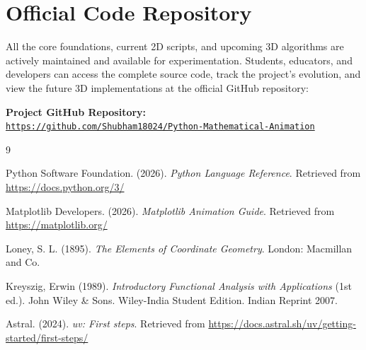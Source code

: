 \documentclass[12pt, a4paper]{report}
\begin{document}
\section{Official Code Repository}
All the core foundations, current 2D scripts, and upcoming 3D algorithms are actively maintained and available for experimentation. Students, educators, and developers can access the complete source code, track the project's evolution, and view the future 3D implementations at the official GitHub repository:

\vspace{0.4cm}
\begin{mdframed}[backgroundcolor=gray!10, linecolor=black, linewidth=1pt, roundcorner=5pt]
    \centering
    \textbf{Project GitHub Repository:} \\
    \vspace{0.2cm}
    \href{https://github.com/Shubham18024/Python-Mathematical-Animation}{\texttt{https://github.com/Shubham18024/Python-Mathematical-Animation}}
\end{mdframed}
\vspace{0.5cm}

\begin{thebibliography}{9}

Python Software Foundation. (2026). \textit{Python Language Reference}. Retrieved from \url{https://docs.python.org/3/}

Matplotlib Developers. (2026). \textit{Matplotlib Animation Guide}. Retrieved from \url{https://matplotlib.org/}

Loney, S. L. (1895). \textit{The Elements of Coordinate Geometry}. London: Macmillan and Co.

Kreyszig, Erwin (1989). \textit{Introductory Functional Analysis with Applications} (1st ed.). John Wiley \& Sons. Wiley-India Student Edition. Indian Reprint 2007.

Astral. (2024). \textit{uv: First steps}. Retrieved from \url{https://docs.astral.sh/uv/getting-started/first-steps/}

\end{thebibliography}
\end{document}
